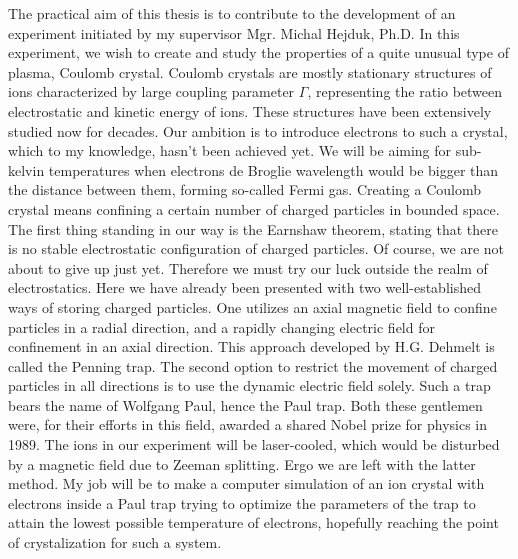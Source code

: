 
The practical aim of this thesis is to contribute to the development of an experiment initiated by my supervisor Mgr. Michal Hejduk, Ph.D. In this experiment, we wish to create and study the properties of a quite unusual type of plasma, Coulomb crystal. Coulomb crystals are mostly stationary structures of ions characterized by large coupling parameter $\Gamma$, representing the ratio between electrostatic and kinetic energy of ions. These structures have been extensively studied now for decades. Our ambition is to introduce electrons to such a crystal, which to my knowledge, hasn't been achieved yet. We will be aiming for sub-kelvin temperatures when electrons de Broglie wavelength would be bigger than the distance between them, forming so-called Fermi gas. Creating a Coulomb crystal means confining a certain number of charged particles in bounded space. The first thing standing in our way is the Earnshaw theorem, stating that there is no stable electrostatic configuration of charged particles. Of course, we are not about to give up just yet. Therefore we must try our luck outside the realm of electrostatics. Here we have already been presented with two well-established ways of storing charged particles. One utilizes an axial magnetic field to confine particles in a radial direction, and a rapidly changing electric field for confinement in an axial direction. This approach developed by H.G. Dehmelt is called the Penning trap. The second option to restrict the movement of charged particles in all directions is to use the dynamic electric field solely. Such a trap bears the name of Wolfgang Paul, hence the Paul trap. Both these gentlemen were, for their efforts in this field, awarded a shared Nobel prize for physics in 1989. The ions in our experiment will be laser-cooled, which would be disturbed by a magnetic field due to Zeeman splitting. Ergo we are left with the latter method. My job will be to make a computer simulation of an ion crystal with electrons inside a Paul trap trying to optimize the parameters of the trap to attain the lowest possible temperature of electrons, hopefully reaching the point of crystalization for such a system.
